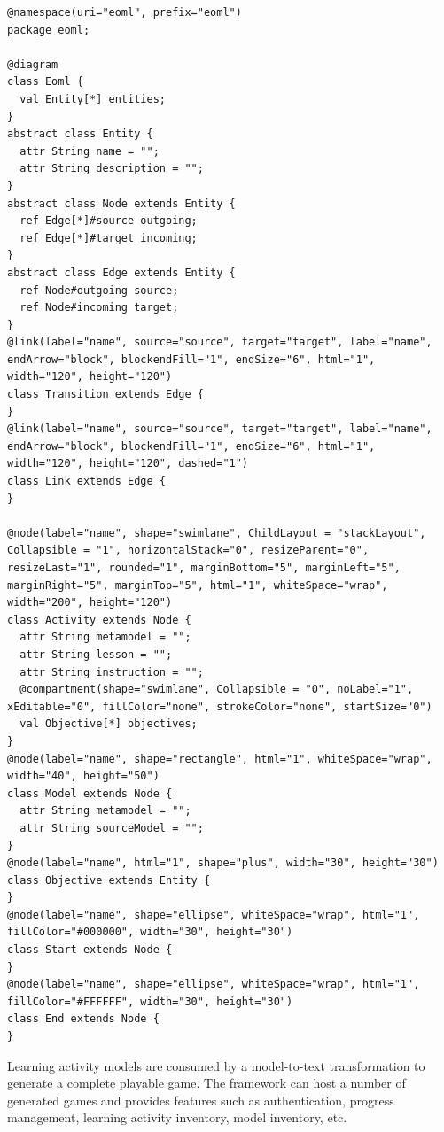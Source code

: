 \documentclass[conference]{IEEEtran}
\begin{document}
\begin{lstlisting}[style=interfaces,caption={The annotated metamodel of learning activity modelling language.}, label=pattern-metamodel]
@namespace(uri="eoml", prefix="eoml")
package eoml;

@diagram
class Eoml {
  val Entity[*] entities;
}
abstract class Entity {
  attr String name = "";
  attr String description = "";
}
abstract class Node extends Entity {
  ref Edge[*]#source outgoing;
  ref Edge[*]#target incoming;
}
abstract class Edge extends Entity {
  ref Node#outgoing source;
  ref Node#incoming target;
}
@link(label="name", source="source", target="target", label="name", endArrow="block", blockendFill="1", endSize="6", html="1", width="120", height="120")
class Transition extends Edge {
}
@link(label="name", source="source", target="target", label="name", endArrow="block", blockendFill="1", endSize="6", html="1", width="120", height="120", dashed="1")
class Link extends Edge {
}

@node(label="name", shape="swimlane", ChildLayout = "stackLayout", Collapsible = "1", horizontalStack="0", resizeParent="0", resizeLast="1", rounded="1", marginBottom="5", marginLeft="5", marginRight="5", marginTop="5", html="1", whiteSpace="wrap", width="200", height="120")
class Activity extends Node {
  attr String metamodel = "";
  attr String lesson = "";
  attr String instruction = "";
  @compartment(shape="swimlane", Collapsible = "0", noLabel="1", xEditable="0", fillColor="none", strokeColor="none", startSize="0")
  val Objective[*] objectives;
}
@node(label="name", shape="rectangle", html="1", whiteSpace="wrap", width="40", height="50")
class Model extends Node {
  attr String metamodel = "";
  attr String sourceModel = "";
}
@node(label="name", html="1", shape="plus", width="30", height="30")
class Objective extends Entity {
}
@node(label="name", shape="ellipse", whiteSpace="wrap", html="1", fillColor="#000000", width="30", height="30")
class Start extends Node {
}
@node(label="name", shape="ellipse", whiteSpace="wrap", html="1", fillColor="#FFFFFF", width="30", height="30")
class End extends Node {
}
\end{lstlisting} 

Learning activity models are consumed by a model-to-text transformation to generate a complete playable game. The framework can host a number of generated games and provides features such as authentication, progress management, learning activity inventory, model inventory, etc.  
\end{document}

